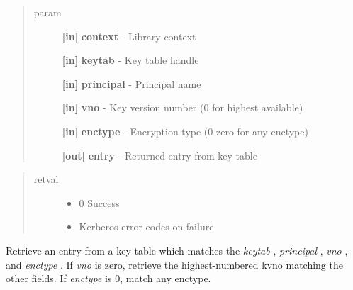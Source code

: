 \documentclass[letterpaper,10pt,english]{sphinxmanual}
\begin{document}
\begin{fulllineitems}
\label{appdev/refs/api/krb5_kt_get_entry:krb5_kt_get_entry}
\end{fulllineitems}

\begin{quote}\begin{description}
\item[{param}] \leavevmode
\textbf{{[}in{]}} \textbf{context} - Library context

\textbf{{[}in{]}} \textbf{keytab} - Key table handle

\textbf{{[}in{]}} \textbf{principal} - Principal name

\textbf{{[}in{]}} \textbf{vno} - Key version number (0 for highest available)

\textbf{{[}in{]}} \textbf{enctype} - Encryption type (0 zero for any enctype)

\textbf{{[}out{]}} \textbf{entry} - Returned entry from key table

\end{description}\end{quote}
\begin{quote}\begin{description}
\item[{retval}] \leavevmode\begin{itemize}
\item {} 
0   Success

\item {} 
Kerberos   error codes on failure

\end{itemize}

\end{description}\end{quote}

Retrieve an entry from a key table which matches the \emph{keytab} , \emph{principal} , \emph{vno} , and \emph{enctype} . If \emph{vno} is zero, retrieve the highest-numbered kvno matching the other fields. If \emph{enctype} is 0, match any enctype.
\end{document}
